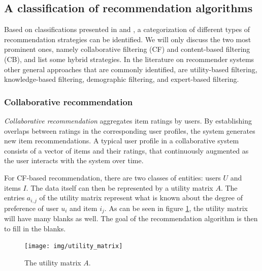 \subsection{A classification of recommendation algorithms}\label{chapter:literature_study:section:computer:subsection:algorithms}

Based on classifications presented in \cite{burke:2002} and \cite{celma:2008:phd}, a categorization of different types of recommendation strategies can be identified. We will only discuss the two most prominent ones, namely collaborative filtering (CF) and content-based filtering (CB)\cite{herlocker:2000, rajaraman:2012}, and list some hybrid strategies. In the literature on recommender systems other general approaches that are commonly identified, are utility-based filtering, knowledge-based filtering, demographic filtering, and expert-based filtering\cite{burke:2002, bostandjiev:2012}.


\subsubsection{Collaborative recommendation}\label{chapter:literature_study:section:computer:subsection:algorithms:subsubsection:cf}

\emph{Collaborative recommendation} aggregates item ratings by users. By establishing overlaps between ratings in the corresponding user profiles, the system generates new item recommendations\cite{burke:2002, herlocker:2000}. A typical user profile in a collaborative system consists of a vector of items and their ratings, that continuously augmented as the user interacts with the system over time\cite{burke:2002}. 

For CF-based recommendation, there are two classes of entities: users $U$ and items $I$. The data itself can then be represented by a utility matrix $A$. The entries $a_{i,j}$ of the utility matrix represent what is known about the degree of preference of user $u_{i}$ and item $i_{j}$\cite{rajaraman:2012}. As can be seen in figure \ref{figure:utilitymatrix}, the utility matrix will have many blanks as well. The goal of the recommendation algorithm is then to fill in the blanks\cite{rajaraman:2012}.

\begin{figure}%
\begin{center}
	\texttt{[image: img/utility\_matrix]}%
\end{center}
	\caption{The utility matrix $A$.}%
	\label{figure:utilitymatrix}%
\end{figure}

